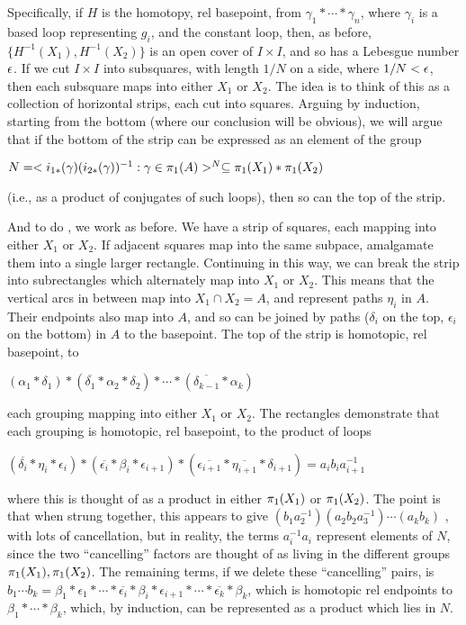 \msk

Specifically, if $H$ is the homotopy, rel basepoint, from 
$\gamma_1*\cdots *\gamma_n$,
where $\gamma_i$ is a based loop representing $g_i$, and the constant
loop, then, as before, $\{H^{-1}(X_1),H^{-1}(X_2)\}$ is an open cover 
of $I\times I$, and so has a Lebesgue number $\epsilon$. If we cut
$I\times I$ into subsquares, with length $1/N$ on a side, where $1/N<\epsilon$,
then each subsquare maps into either $X_1$ or $X_2$. The idea is to 
think of this as a collection of horizontal strips, each cut into squares.
Arguing by induction, starting from the bottom (where our conclusion
will be obvious), we will argue that if the bottom of the strip
can be expressed as an element of the group 

$N = <i_{1*}(\gamma)(i_{2*}(\gamma))^{-1} : 
\gamma\in\pi_1(A) >^N\subseteq \pi_1(X_1)*\pi_1(X_2)$ 

(i.e., as a product
of conjugates of such loops), then so can the 
top of the strip. 

\msk

\leavevmode

\epsfxsize=4in

\msk

And to do , we work as before. We have a strip of squares,
each mapping into either $X_1$ or $X_2$. If adjacent squares map into the
same subpace, amalgamate them into a single larger rectangle. Continuing
in this way, we can break the strip into subrectangles which
alternately map into $X_1$ or $X_2$. This means that the vertical arcs
in between map into $X_1\cap X_2 = A$, and represent paths $\eta_i$ in 
$A$. Their endpoints also map into $A$,
and so can be joined by paths ($\delta_i$  on the top, $\epsilon_i$ 
on the bottom) in $A$ to the basepoint. The top of the strip is
homotopic, rel basepoint, to 

$(\alpha_1*\delta_1)*(\overline{\delta_1}*\alpha_2*\delta_2)*\cdots *
(\overline{\delta_{k-1}}*\alpha_k)$

each grouping mapping into either $X_1$ or $X_2$.
The rectangles demonstrate that each grouping is homotopic, rel basepoint,
to the product of loops

$(\overline{\delta_i}*\eta_i*\epsilon_i)*
(\overline{\epsilon_i}*\beta_i*\epsilon_{i+1})*
(\overline{\epsilon_{i+1}}*\overline{\eta_{i+1}}*\delta_{i+1})
=a_i b_i a_{i+1}^{-1}$

where this is thought of as a product in either $\pi_1(X_1)$ or
$\pi_1(X_2)$. The point is that when strung together, this appears
to give $(b_1a_2^{-1})(a_2b_2a_3^{-1})\cdots (a_kb_k)$ , with lots
of cancellation, but in reality, the terms $a_i^{-1}a_i$ represent
elements of $N$, since the two ``cancelling'' 
factors are thought of as living in the
different groups $\pi_1(X_1),\pi_1(X_2)$. The remaining terms, if we
delete these ``cancelling'' pairs, is 
$b_1\cdots b_k = 
\beta_1*\epsilon_1*\cdots *\overline{\epsilon_i}*\beta_i*\epsilon_{i+1}
*\cdots * \overline{\epsilon_k}*\beta_k$, which is homotopic
rel endpoints to $\beta_1*\cdots *\beta_k$, which, by induction, can 
be represented as a product which lies in $N$. 

